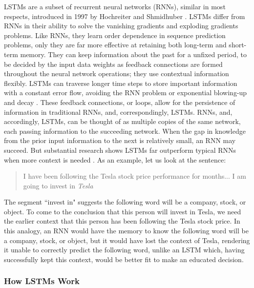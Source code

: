 \documentclass[10pt,twocolumn]{article}
\begin{document}
LSTMs are a subset of recurrent neural networks (RNNs), similar in most respects, introduced in 1997 by Hochreiter and Shmidhuber \cite{UnderstandingLSTMs}. LSTMs differ from RNNs in their ability to solve the vanishing gradients and exploding gradients problems. Like RNNs, they learn order dependence in sequence prediction problems, only they are far more effective at retaining both long-term and short-term memory. They can keep information about the past for a unfixed period, to be decided by the input data weights as feedback connections are formed throughout the neural network operations; they use contextual information flexibly. LSTMs can traverse longer time steps to store important information with a constant error flow, avoiding the RNN problem or exponential blowing-up and decay \cite{GentleIntroductionToLSTMNetworks}. These feedback connections, or loops, allow for the persistence of information in traditional RNNs, and, correspondingly, LSTMs. RNNs, and, accordingly, LSTMs, can be thought of as multiple copies of the same network, each passing information to the succeeding network. When the gap in knowledge from the prior input information to the next is relatively small, an RNN may succeed. But substantial research shows LSTMs far outperform typical RNNs when more context is needed \cite{UnderstandingLSTMs}. As an example, let us look at the sentence:

\begin{quote}
    I have been following the Tesla stock price performance for months... I am going to invest in \emph{Tesla}
\end{quote}

The segment ``invest in" suggests the following word will be a company, stock, or object. To come to the conclusion that this person will invest in Tesla, we need the earlier context that this person has been following the Tesla stock price. In this analogy, an RNN would have the memory to know the following word will be a company, stock, or object, but it would have lost the context of Tesla, rendering it unable to correctly predict the following word, unlike an LSTM which, having successfully kept this context, would be better fit to make an educated decision.

\subsubsection{How LSTMs Work}
\end{document}
